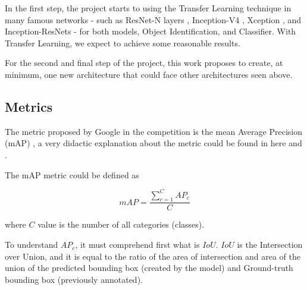 \documentclass[11pt, a4paper, onecolumn]{article}
\begin{document}
In the first step, the project starts to using the Transfer Learning technique in many famous networks - such as ResNet-N layers \cite{resnet}, Inception-V4 \cite{inception}, Xception \cite{xception}, and Inception-ResNets \cite{inception} - for both models, Object Identification, and Classifier. With Transfer Learning, we expect to achieve some reasonable results.

For the second and final step of the project, this work proposes to create, at minimum, one new architecture that could face other architectures seen above.

\subsection{Metrics}

The metric proposed by Google in the competition is the mean Average Precision (mAP) \cite{map}, a very didactic explanation about the metric could be found in here \cite{medium:1} and \cite{medium:2}.

The mAP metric could be defined as

{\centering
	\begin{equation*}
	mAP = \frac{\sum\limits_{c=1}^{C}AP_c} {C}
	\end{equation*}}

where $C$ value is the number of all categories (classes).

To understand $AP_c$, it must comprehend first what is $IoU$. $IoU$ is the Intersection over Union, and it is equal to the ratio of the area of intersection and area of the union of the predicted bounding box (created by the model) and Ground-truth bounding box (previously annotated).


\begin{figure}[!ht]
	\centering
	\qquad
	\label{fig:example}%
\end{figure}
\end{document}
